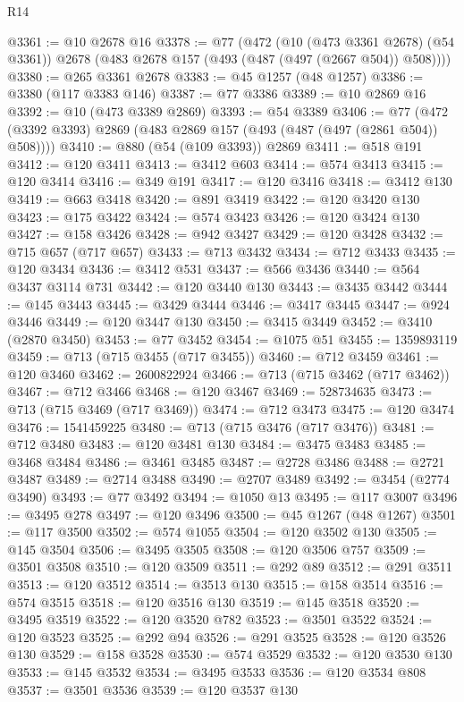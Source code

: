 \begin{lexlean}{R14}
\begin{coremodule}
{{{{{{{{{{{{{{{{{{{{{{{{{{{{{{{{{{{{{{{{{{{{{{{{{{{{{{{{{{{{{{{{{{{{{{{{{{{{{{{{{{{{{{{{{{{{{{{{{{{{{{{{{{@3361 := @10 @2678 @16
@3378 := @77
    (@472
      (@10 (@473 @3361 @2678) (@54 @3361))
      @2678
      (@483 @2678 @157 (@493 (@487 (@497 (@2667 @504)) @508))))
@3380 := @265 @3361 @2678
@3383 := @45 @1257 (@48 @1257)
@3386 := @3380 (@117 @3383 @146)
@3387 := @77 @3386
@3389 := @10 @2869 @16
@3392 := @10 (@473 @3389 @2869)
@3393 := @54 @3389
@3406 := @77 (@472 (@3392 @3393) @2869 (@483 @2869 @157 (@493 (@487 (@497 (@2861 @504)) @508))))
@3410 := @880 (@54 (@109 @3393)) @2869
@3411 := @518 @191
@3412 := @120 @3411
@3413 := @3412 @603
@3414 := @574 @3413
@3415 := @120 @3414
@3416 := @349 @191
@3417 := @120 @3416
@3418 := @3412 @130
@3419 := @663 @3418
@3420 := @891 @3419
@3422 := @120 @3420 @130
@3423 := @175 @3422
@3424 := @574 @3423
@3426 := @120 @3424 @130
@3427 := @158 @3426
@3428 := @942 @3427
@3429 := @120 @3428
@3432 := @715 @657 (@717 @657)
@3433 := @713 @3432
@3434 := @712 @3433
@3435 := @120 @3434
@3436 := @3412 @531
@3437 := @566 @3436
@3440 := @564 @3437 @3114 @731
@3442 := @120 @3440 @130
@3443 := @3435 @3442
@3444 := @145 @3443
@3445 := @3429 @3444
@3446 := @3417 @3445
@3447 := @924 @3446
@3449 := @120 @3447 @130
@3450 := @3415 @3449
@3452 := @3410 (@2870 @3450)
@3453 := @77 @3452
@3454 := @1075 @51
@3455 := 1359893119
@3459 := @713 (@715 @3455 (@717 @3455))
@3460 := @712 @3459
@3461 := @120 @3460
@3462 := 2600822924
@3466 := @713 (@715 @3462 (@717 @3462))
@3467 := @712 @3466
@3468 := @120 @3467
@3469 := 528734635
@3473 := @713 (@715 @3469 (@717 @3469))
@3474 := @712 @3473
@3475 := @120 @3474
@3476 := 1541459225
@3480 := @713 (@715 @3476 (@717 @3476))
@3481 := @712 @3480
@3483 := @120 @3481 @130
@3484 := @3475 @3483
@3485 := @3468 @3484
@3486 := @3461 @3485
@3487 := @2728 @3486
@3488 := @2721 @3487
@3489 := @2714 @3488
@3490 := @2707 @3489
@3492 := @3454 (@2774 @3490)
@3493 := @77 @3492
@3494 := @1050 @13
@3495 := @117 @3007
@3496 := @3495 @278
@3497 := @120 @3496
@3500 := @45 @1267 (@48 @1267)
@3501 := @117 @3500
@3502 := @574 @1055
@3504 := @120 @3502 @130
@3505 := @145 @3504
@3506 := @3495 @3505
@3508 := @120 @3506 @757
@3509 := @3501 @3508
@3510 := @120 @3509
@3511 := @292 @89
@3512 := @291 @3511
@3513 := @120 @3512
@3514 := @3513 @130
@3515 := @158 @3514
@3516 := @574 @3515
@3518 := @120 @3516 @130
@3519 := @145 @3518
@3520 := @3495 @3519
@3522 := @120 @3520 @782
@3523 := @3501 @3522
@3524 := @120 @3523
@3525 := @292 @94
@3526 := @291 @3525
@3528 := @120 @3526 @130
@3529 := @158 @3528
@3530 := @574 @3529
@3532 := @120 @3530 @130
@3533 := @145 @3532
@3534 := @3495 @3533
@3536 := @120 @3534 @808
@3537 := @3501 @3536
@3539 := @120 @3537 @130
}}}}}}}}}}}}}}}}}}}}}}}}}}}}}}}}}}}}}}}}}}}}}}}}}}}}}}}}}}}}}}}}}}}}}}}}}}}}}}}}}}}}}}}}}}}}}}}}}}}}}}}}}}
\end{coremodule}
\end{lexlean}
